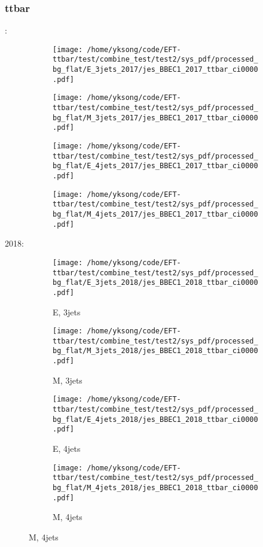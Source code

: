 \documentclass{beamer}
\begin{document}
\begin{frame}
\frametitle{ttbar}
\fontsize{5}{1}:
\begin{figure}
\centering
\begin{subfigure}[b]{0.24\textwidth}
\texttt{[image: /home/yksong/code/EFT-ttbar/test/combine\_test/test2/sys\_pdf/processed\_bg\_flat/E\_3jets\_2017/jes\_BBEC1\_2017\_ttbar\_ci0000.pdf]}
\end{subfigure}
\begin{subfigure}[b]{0.24\textwidth}
\texttt{[image: /home/yksong/code/EFT-ttbar/test/combine\_test/test2/sys\_pdf/processed\_bg\_flat/M\_3jets\_2017/jes\_BBEC1\_2017\_ttbar\_ci0000.pdf]}
\end{subfigure}
\begin{subfigure}[b]{0.24\textwidth}
\texttt{[image: /home/yksong/code/EFT-ttbar/test/combine\_test/test2/sys\_pdf/processed\_bg\_flat/E\_4jets\_2017/jes\_BBEC1\_2017\_ttbar\_ci0000.pdf]}
\end{subfigure}
\begin{subfigure}[b]{0.24\textwidth}
\texttt{[image: /home/yksong/code/EFT-ttbar/test/combine\_test/test2/sys\_pdf/processed\_bg\_flat/M\_4jets\_2017/jes\_BBEC1\_2017\_ttbar\_ci0000.pdf]}
\end{subfigure}
\end{figure}
2018:
\begin{figure}
\centering
\begin{subfigure}[b]{0.24\textwidth}
\texttt{[image: /home/yksong/code/EFT-ttbar/test/combine\_test/test2/sys\_pdf/processed\_bg\_flat/E\_3jets\_2018/jes\_BBEC1\_2018\_ttbar\_ci0000.pdf]}
\captionsetup{font=tiny}
\caption{E, 3jets}
\end{subfigure}
\begin{subfigure}[b]{0.24\textwidth}
\texttt{[image: /home/yksong/code/EFT-ttbar/test/combine\_test/test2/sys\_pdf/processed\_bg\_flat/M\_3jets\_2018/jes\_BBEC1\_2018\_ttbar\_ci0000.pdf]}
\captionsetup{font=tiny}
\caption{M, 3jets}
\end{subfigure}
\begin{subfigure}[b]{0.24\textwidth}
\texttt{[image: /home/yksong/code/EFT-ttbar/test/combine\_test/test2/sys\_pdf/processed\_bg\_flat/E\_4jets\_2018/jes\_BBEC1\_2018\_ttbar\_ci0000.pdf]}
\captionsetup{font=tiny}
\caption{E, 4jets}
\end{subfigure}
\begin{subfigure}[b]{0.24\textwidth}
\texttt{[image: /home/yksong/code/EFT-ttbar/test/combine\_test/test2/sys\_pdf/processed\_bg\_flat/M\_4jets\_2018/jes\_BBEC1\_2018\_ttbar\_ci0000.pdf]}
\captionsetup{font=tiny}
\caption{M, 4jets}
\end{subfigure}
\end{figure}
\end{frame}
\end{document}
